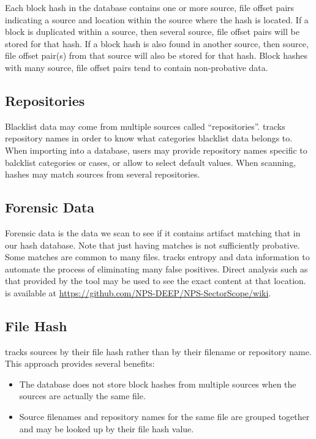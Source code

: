 \documentclass[11pt,fleqn]{article} %
\begin{document}
Each block hash in the database contains one or more source, file offset pairs indicating a source and location within the source where the hash is located.  If a block is duplicated within a source, then several source, file offset pairs will be stored for that hash.  If a block hash is also found in another source, then source, file offset pair(s) from that source will also be stored for that hash. Block hashes with many source, file offset pairs tend to contain non-probative data.\\

\subsection{Repositories}
Blacklist data may come from multiple sources called ``repositories''. \hdb tracks repository names in order to know what categories blacklist data belongs to. When importing into a database, users may provide repository names specific to balcklist categories or cases, or allow \hdb to select default values.  When scanning, hashes may match sources from several repositories.\\

\subsection{Forensic Data}
Forensic data is the data we scan to see if it contains artifact matching
that in our hash database.
Note that just having matches is not sufficiently probative.
Some matches are common to many files.
\hdb tracks entropy and data information to automate the process
of eliminating many false positives.
Direct analysis such as that provided by the \sscope tool
may be used to see the exact content at that location.
\sscope is available at \url{https://github.com/NPS-DEEP/NPS-SectorScope/wiki}.

\subsection{File Hash}
\hdb tracks sources by their file hash rather than by their filename
or repository name.  This approach provides several benefits:

\begin{itemize}
\item The database does not store block hashes from multiple sources
when the sources are actually the same file.
\item Source filenames and repository names for the same file are grouped
together and may be looked up by their file hash value.
\end{itemize}
\end{document}
